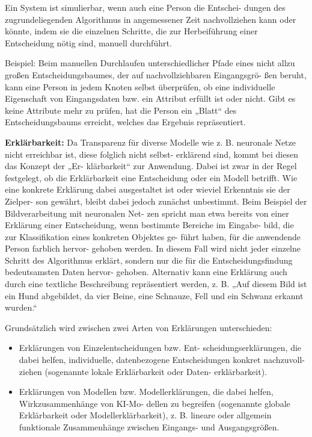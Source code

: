\documentclass[11pt,a4paper]{article}
\numberwithin{equation}{section}
\begin{document}
	Ein System ist simulierbar, wenn
	auch eine Person die Entschei-
	dungen des zugrundeliegenden
	Algorithmus in angemessener
	Zeit nachvollziehen kann oder
	könnte, indem sie die einzelnen
	Schritte, die zur Herbeiführung
	einer Entscheidung nötig sind,
	manuell durchführt.	
	
	Beispiel: Beim manuellen
	Durchlaufen unterschiedlicher
	Pfade eines nicht allzu großen
	Entscheidungsbaumes, der auf
	nachvollziehbaren Eingangsgrö-
	ßen beruht, kann eine Person in
	jedem Knoten selbst überprüfen,
	ob eine individuelle Eigenschaft
	von Eingangsdaten bzw. ein Attribut erfüllt ist oder nicht.
	Gibt es keine Attribute mehr zu prüfen, hat die Person
	ein „Blatt“ des Entscheidungsbaums erreicht, welches
	das Ergebnis repräsentiert. 
	
	\noindent \textbf{Erklärbarkeit: }Da Transparenz für diverse Modelle wie z. B. neuronale
	Netze nicht erreichbar ist, diese folglich nicht selbst-
	erklärend sind, kommt bei diesen das Konzept der „Er-
	klärbarkeit“ zur Anwendung. Dabei ist zwar in der Regel
	festgelegt, ob die Erklärbarkeit eine Entscheidung oder
	ein Modell betrifft. Wie eine konkrete Erklärung dabei
	ausgestaltet ist oder wieviel Erkenntnis sie der Zielper-
	son gewährt, bleibt dabei jedoch zunächst unbestimmt.
	Beim Beispiel der Bildverarbeitung mit neuronalen Net-
	zen spricht man etwa bereits von einer Erklärung einer
	Entscheidung, wenn bestimmte Bereiche im Eingabe-
	bild, die zur Klassifikation eines konkreten Objektes ge-
	führt haben, für die anwendende Person farblich hervor-
	gehoben werden. In diesem Fall wird nicht jeder einzelne
	Schritt des Algorithmus erklärt, sondern nur die für die
	Entscheidungsfindung bedeutsamsten Daten hervor-
	gehoben. Alternativ kann eine Erklärung auch durch eine
	textliche Beschreibung repräsentiert werden, z. B. „Auf
	diesem Bild ist ein Hund abgebildet, da vier Beine, eine
	Schnauze, Fell und ein Schwanz erkannt wurden.“
	
	Grundsätzlich wird zwischen zwei Arten von Erklärungen unterschieden:
	
	\begin{itemize}
		\item Erklärungen von Einzelentscheidungen bzw. Ent-
		scheidungserklärungen, die dabei helfen, individuelle,
		datenbezogene Entscheidungen konkret nachzuvoll-
		ziehen (sogenannte lokale Erklärbarkeit oder Daten-
		erklärbarkeit).
		\item Erklärungen von Modellen bzw. Modellerklärungen,
		die dabei helfen, Wirkzusammenhänge von KI-Mo-
		dellen zu begreifen (sogenannte globale Erklärbarkeit
		oder Modellerklärbarkeit), z. B. lineare oder allgemein
		funktionale Zusammenhänge zwischen Eingangs-
		und Ausgangsgrößen.
	\end{itemize}
\end{document}
